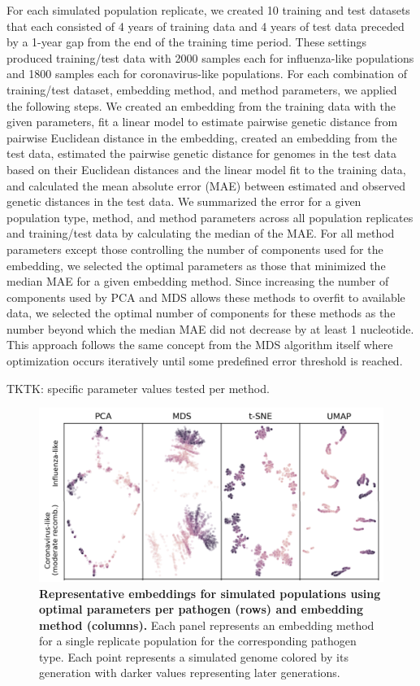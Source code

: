 \documentclass[10pt,letterpaper]{article}
\begin{document}
For each simulated population replicate, we created 10 training and test datasets that each consisted of 4 years of training data and 4 years of test data preceded by a 1-year gap from the end of the training time period.
These settings produced training/test data with 2000 samples each for influenza-like populations and 1800 samples each for coronavirus-like populations.
For each combination of training/test dataset, embedding method, and method parameters, we applied the following steps.
We created an embedding from the training data with the given parameters, fit a linear model to estimate pairwise genetic distance from pairwise Euclidean distance in the embedding, created an embedding from the test data, estimated the pairwise genetic distance for genomes in the test data based on their Euclidean distances and the linear model fit to the training data, and calculated the mean absolute error (MAE) between estimated and observed genetic distances in the test data.
We summarized the error for a given population type, method, and method parameters across all population replicates and training/test data by calculating the median of the MAE.
For all method parameters except those controlling the number of components used for the embedding, we selected the optimal parameters as those that minimized the median MAE for a given embedding method.
Since increasing the number of components used by PCA and MDS allows these methods to overfit to available data, we selected the optimal number of components for these methods as the number beyond which the median MAE did not decrease by at least 1 nucleotide.
This approach follows the same concept from the MDS algorithm itself where optimization occurs iteratively until some predefined error threshold is reached.

TKTK: specific parameter values tested per method.

\begin{figure}[!h]
\includegraphics[width=\columnwidth]{figures/simulated-populations-representative-embeddings.png}
\caption{{\bf Representative embeddings for simulated populations using optimal parameters per pathogen (rows) and embedding method (columns).}
  Each panel represents an embedding method for a single replicate population for the corresponding pathogen type.
  Each point represents a simulated genome colored by its generation with darker values representing later generations.}
\label{fig:simulated-populations-representative-embeddings}
\end{figure}
\end{document}
